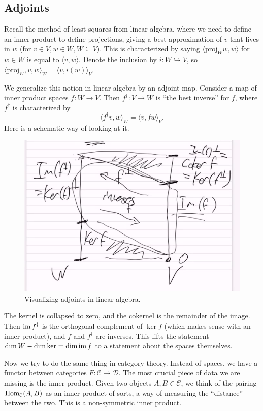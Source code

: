 \subsection{Adjoints}
Recall the method of least squares from linear algebra, where we need to define an inner product to define projections, giving a best approximation of $v$ that lives in $w$ (for $v\in  V,w \in W, W \subseteq V$). This is characterized by saying $\langle \mathrm{proj}_W w, w \rangle $ for $w \in W$ is equal to $\langle v,w \rangle $. Denote the inclusion by $i \colon W \hookrightarrow V $, so $\langle \mathrm{proj}_W, v,w \rangle _W= \langle v, i(w) \rangle _V$.

We generalize this notion in linear algebra by an adjoint map. Consider a map of inner product spaces $f \colon W \to V$. Then $f^{\dag} \colon V \to W$ is ``the best inverse'' for $f$, where $f^{\dag}$ is characterized by \[
\langle f ^{\dag}v, w \rangle _W=\langle v, fw \rangle _V.
\] Here is a schematic way of looking at it. 
\begin{figure}[H]
\centering
 \includegraphics[width=0.6\linewidth]{figures/adjoint.png}
 \caption{Visualizing adjoints in linear algebra.} 
 \label{adj} 
\end{figure}
The kernel is collapsed to zero, and the cokernel is the remainder of the image. Then $\operatorname{im} f^{\dag}$ is the orthogonal complement of  $\ker f$ (which makes sense with an inner product), and $f$ and $f^{\dag}$ are inverses. This lifts the statement $\dim W-\dim \ker = \dim \operatorname{im} f$ to a statement about the spaces themselves.

Now we try to do the same thing in category theory. Instead of spaces, we have a functor between categories  $F \colon \mathcal{C}  \to \mathcal{D} $. The most crucial piece of data we are missing is the inner product. Given two objects $A,B \in \mathcal{C} $, we think of the pairing $\operatorname{Hom} _{\mathcal{C} }(A,B)$ as an inner product of sorts, a way of measuring the ``distance'' between the two. This is a non-symmetric inner product.

